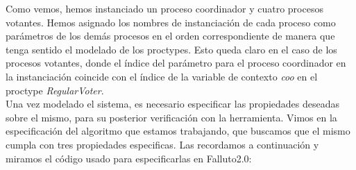 \documentclass[titlepage, 12pt]{book}
\begin{document}
Como vemos, hemos instanciado un proceso coordinador y cuatro procesos votantes. Hemos asignado los nombres de instanciaci\'on de cada proceso como par\'ametros de los dem\'as procesos en el orden correspondiente de manera que tenga sentido el modelado de los proctypes. Esto queda claro en el caso de los procesos votantes, donde el \'indice del par\'ametro para el proceso coordinador en la instanciaci\'on coincide con el \'indice de la variable de contexto \textit{coo} en el proctype \textit{RegularVoter}.\\

Una vez modelado el sistema, es necesario especificar las propiedades deseadas sobre el mismo, para su posterior verificaci\'on con la herramienta. Vimos en la especificaci\'on del algoritmo que estamos trabajando, que buscamos que el mismo cumpla con tres propiedades especificas. Las recordamos a continuaci\'on y miramos el c\'odigo usado para especificarlas en Falluto2.0:
\end{document}
